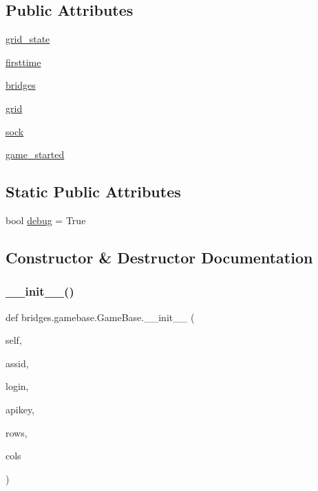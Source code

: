 \subsection*{Public Attributes}
\begin{DoxyCompactItemize}
\item 
\hyperlink{classbridges_1_1gamebase_1_1_game_base_ae397f4d601671d036d9c92902ba2d7f1}{grid\+\_\+state}
\item 
\hyperlink{classbridges_1_1gamebase_1_1_game_base_a1115f9b91c925f4aa5155ec0e7831ee2}{firsttime}
\item 
\hyperlink{classbridges_1_1gamebase_1_1_game_base_a2310e51f398c089ca945b3af38c09231}{bridges}
\item 
\hyperlink{classbridges_1_1gamebase_1_1_game_base_a556463882cb4a3a00c6c356d1c4a4322}{grid}
\item 
\hyperlink{classbridges_1_1gamebase_1_1_game_base_a4a7fe2d524c02966900937bddea195e7}{sock}
\item 
\hyperlink{classbridges_1_1gamebase_1_1_game_base_a3686759454ab901fcb4afb81572b3104}{game\+\_\+started}
\end{DoxyCompactItemize}
\subsection*{Static Public Attributes}
\begin{DoxyCompactItemize}
\item 
bool \hyperlink{classbridges_1_1gamebase_1_1_game_base_a25e8f6f349f54300666127f58669356c}{debug} = True
\end{DoxyCompactItemize}


\subsection{Constructor \& Destructor Documentation}
\mbox{\label{classbridges_1_1gamebase_1_1_game_base_a590e8712065678b03ccd8a6012b7220f}} 
\subsubsection{\texorpdfstring{\+\_\+\+\_\+init\+\_\+\+\_\+()}{\_\_init\_\_()}}
{\footnotesize\ttfamily def bridges.\+gamebase.\+Game\+Base.\+\_\+\+\_\+init\+\_\+\+\_\+ (\begin{DoxyParamCaption}\item[{}]{self,  }\item[{}]{assid,  }\item[{}]{login,  }\item[{}]{apikey,  }\item[{}]{rows,  }\item[{}]{cols }\end{DoxyParamCaption})}



